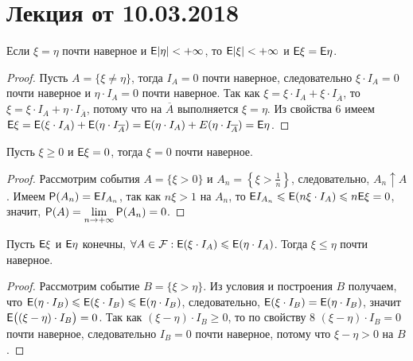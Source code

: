 \section{Лекция от 10.03.2018}
\begin{property}
	Если $\xi = \eta$ почти наверное и $\E | \eta| < +\infty$, то $\E | \xi| < +\infty$ и $\E \xi = \E \eta$.
	\begin{proof}
		Пусть $A = \{ \xi \neq \eta \}$, тогда $I_A = 0$ почти наверное, следовательно $\xi \cdot I_A = 0$ почти наверное и $\eta \cdot I_A = 0$ почти наверное. Так как $\xi = \xi \cdot I_A + \xi \cdot I_{\overline A}$, то $\xi = \xi \cdot I_A + \eta \cdot I_{\overline A}$, потому что на $\overline A$ выполняется $\xi = \eta$. Из свойства 6 имеем $\E \xi = \E ( \xi \cdot I_A ) + \E (\eta \cdot I_{\overline A} ) = \E ( \eta \cdot I_A) + E ( \eta \cdot I_{\overline A} ) = \E \eta$. 
	\end{proof}
\end{property}

\begin{property}
	Пусть $\xi \geqslant 0$ и $\E \xi = 0$, тогда $\xi = 0$ почти наверное.
	\begin{proof}
		Рассмотрим события $A = \{ \xi > 0 \}$ и $A_n = \left\{ \xi > \frac{1}{n} \right\} $, следовательно, $A_n \uparrow A$. Имеем $\P (A_n) = \E I_{A_n}$, так как $n\xi > 1$ на $A_n$, то  $\E I_{A_n} \leqslant \E (n\xi \cdot I_A) \leqslant n \E \xi = 0$, значит, $\P(A) = \lim\limits_{n \rightarrow +\infty} \P (A_n) = 0$.
	\end{proof}
\end{property}

\begin{property}
	Пусть $\E \xi$ и $\E \eta$ конечны, $\forall A \in \F: \E (\xi \cdot I_A) \leqslant \E ( \eta \cdot I_A)$. Тогда  $\xi \leqslant \eta$ почти наверное.
	\begin{proof}
		Рассмотрим событие $B = \{ \xi > \eta \}$. Из условия и построения $B$ получаем, что $\E (\eta \cdot I_B) \leqslant \E (\xi \cdot I_B) \leqslant \E (\eta \cdot I_B)$, следовательно, $\E( \xi \cdot I_B) = \E(\eta \cdot I_B)$, значит $\E \big( (\xi - \eta) \cdot I_B \big) = 0$. Так как $(\xi - \eta) \cdot I_B \geqslant 0$, то по свойству 8 $(\xi - \eta) \cdot I_B = 0$ почти наверное, следовательно $I_B = 0$ почти наверное, потому что $\xi- \eta > 0$ на $B$.
	\end{proof}
\end{property}

